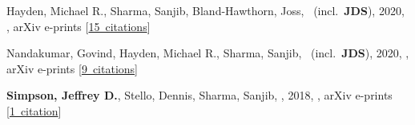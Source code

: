 \item[{\color{numcolor}\scriptsize3}] Hayden, Michael R., Sharma, Sanjib, Bland-Hawthorn, Joss, \etal\ (incl.\ \textbf{JDS}), 2020, , arXiv e-prints [\href{https://ui.adsabs.harvard.edu/#abs/2020arXiv201113745H}{15~citations}]

\item[{\color{numcolor}\scriptsize2}] Nandakumar, Govind, Hayden, Michael R., Sharma, Sanjib, \etal\ (incl.\ \textbf{JDS}), 2020, , arXiv e-prints [\href{https://ui.adsabs.harvard.edu/#abs/2020arXiv201102783N}{9~citations}]

\item[{\color{numcolor}\scriptsize1}] \textbf{Simpson, Jeffrey D.}, Stello, Dennis, Sharma, Sanjib, \etal, 2018, , arXiv e-prints [\href{https://ui.adsabs.harvard.edu/#abs/2018arXiv180405900S}{1~citation}]